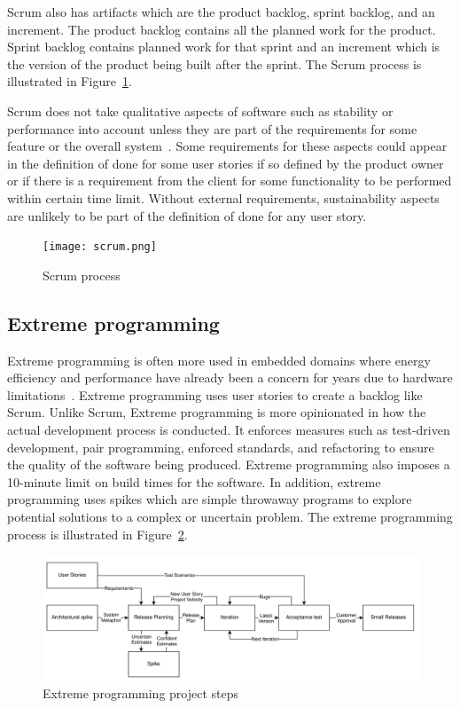 Scrum also has artifacts which are the product backlog, sprint backlog, and an increment. The product backlog contains all the planned work for the product. Sprint backlog contains planned work for that sprint and an increment which is the version of the product being built after the sprint. The Scrum process is illustrated in Figure~\ref{scrumprocess}.~\cite{scrumguide}

Scrum does not take qualitative aspects of software such as stability or performance into account unless they are part of the requirements for some feature or the overall system~\cite{scrumguide}. Some requirements for these aspects could appear in the definition of done for some user stories if so defined by the product owner or if there is a requirement from the client for some functionality to be performed within certain time limit. Without external requirements, sustainability aspects are unlikely to be part of the definition of done for any user story.

\begin{figure}[H]
\caption{Scrum process~\cite{scrumWhatScrum}}
\label{scrumprocess}
\texttt{[image: scrum.png]}
\centering
\end{figure}

\subsection{Extreme programming}\label{xp}
Extreme programming is often more used in embedded domains where energy efficiency and performance have already been a concern for years due to hardware limitations~\cite{agilemethodsinembedded}. Extreme programming uses user stories to create a backlog like Scrum. Unlike Scrum, Extreme programming is more opinionated in how the actual development process is conducted. It enforces measures such as test-driven development, pair programming, enforced standards, and refactoring to ensure the quality of the software being produced. Extreme programming also imposes a 10-minute limit on build times for the software. In addition, extreme programming uses spikes which are simple throwaway programs to explore potential solutions to a complex or uncertain problem. The extreme programming process is illustrated in Figure~\ref{xpprocess}.~\cite{extremeprogrammingExtremeProgramming}

\begin{figure}[H]
\caption{Extreme programming project steps~\cite{extremeprogrammingFlowChart}}
\label{xpprocess}
\includegraphics[width=\textwidth]{images/xp.png}
\centering
\end{figure}

